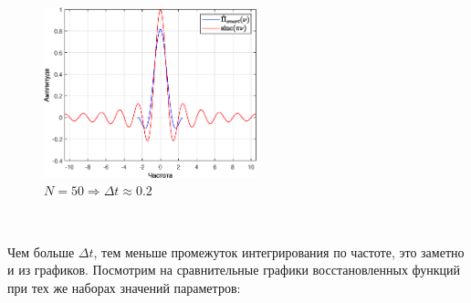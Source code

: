 \documentclass[a4paper]{article}
\begin{document}
\begin{figure}[H]
    \centering \includegraphics[width=0.55\textwidth]{graphs/3/T_10_dt_0.20408_V_5_dv_0.1/fourier_smart.eps}
    \caption{$N = 50 \Rightarrow \Delta t \approx 0.2$}
\end{figure}\noindent\

Чем больше $\Delta t$, тем меньше промежуток интегрирования  по частоте, это заметно и из графиков. Посмотрим на сравнительные графики восстановленных функций при тех же наборах значений параметров:
\end{document}
